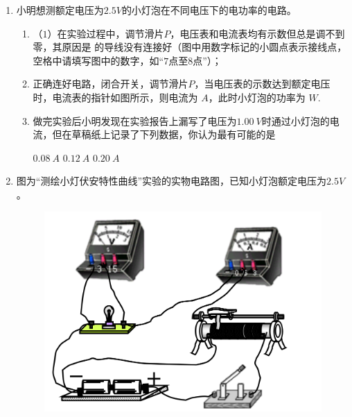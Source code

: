 
\begin{enumerate}[leftmargin=0em]
\renewcommand{\labelenumi}{\arabic{enumi}.}
\item
小明想测额定电压为$ 2.5V $的小灯泡在不同电压下的电功率的电路。
\begin{figure}[h!]
\centering

\end{figure}

\begin{enumerate}
\renewcommand{\labelenumi}{\arabic{enumi}.}
\item
（$ 1 $）在实验过程中，调节滑片$ P $，电压表和电流表均有示数但总是调不到零，其原因是  
的导线没有连接好（图中用数字标记的小圆点表示接线点，空格中请填写图中的数字，如“$ 7 $点至$ 8 $点”）；
\item 
正确连好电路，闭合开关，调节滑片$ P $，当电压表的示数达到额定电压时，电流表的指针如图所示，则电流为  
$ A $，此时小灯泡的功率为  
$ W $.
\begin{figure}[h!]
\centering

\end{figure}

\item 
做完实验后小明发现在实验报告上漏写了电压为$ 1.00\ V $时通过小灯泡的电流，但在草稿纸上记录了下列数据，你认为最有可能的是  

\threechoices
{$ 0.08\ A $}
{$ 0.12\ A $}
{$ 0.20\ A $}




\end{enumerate}



\newpage
\item 
{}
图为“测绘小灯伏安特性曲线”实验的实物电路图，已知小灯泡额定电压为$ 2.5V $。
\begin{figure}[h!]
\centering
\includegraphics[width=0.5\linewidth]{picture/screenshot012}
\end{figure}


\end{enumerate}
